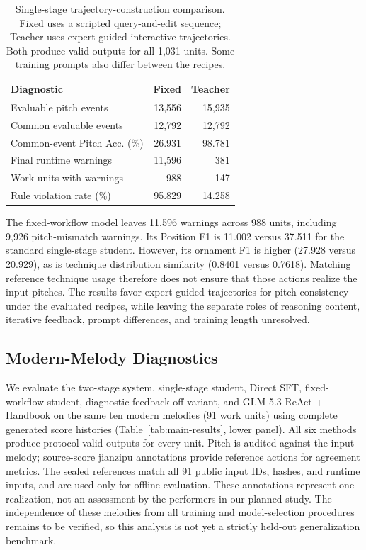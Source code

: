 \begin{table}[t]
\centering\small
\setlength{\tabcolsep}{4pt}
\begin{tabularx}{\linewidth}{@{}Xrr@{}}
\toprule
Diagnostic & Fixed & Teacher \\
\midrule
Evaluable pitch events & 13,556 & 15,935 \\
Common evaluable events & 12,792 & 12,792 \\
Common-event Pitch Acc. (\%) & 26.931 & 98.781 \\
Final runtime warnings & 11,596 & 381 \\
Work units with warnings & 988 & 147 \\
Rule violation rate (\%) & 95.829 & 14.258 \\
\bottomrule
\end{tabularx}
\caption{Single-stage trajectory-construction comparison. Fixed uses a scripted query-and-edit sequence; Teacher uses expert-guided interactive trajectories. Both produce valid outputs for all 1,031 units. Some training prompts also differ between the recipes.}
\label{tab:trajectory-ablation}
\end{table}

The fixed-workflow model leaves 11,596 warnings across 988 units, including 9,926 pitch-mismatch warnings. Its Position F1 is 11.002 versus 37.511 for the standard single-stage student. However, its ornament F1 is higher (27.928 versus 20.929), as is technique distribution similarity (0.8401 versus 0.7618). Matching reference technique usage therefore does not ensure that those actions realize the input pitches. The results favor expert-guided trajectories for pitch consistency under the evaluated recipes, while leaving the separate roles of reasoning content, iterative feedback, prompt differences, and training length unresolved.

\subsection{Modern-Melody Diagnostics}
We evaluate the two-stage system, single-stage student, Direct SFT, fixed-workflow student, diagnostic-feedback-off variant, and GLM-5.3 ReAct + Handbook on the same ten modern melodies (91 work units) using complete generated score histories (Table~\ref{tab:main-results}, lower panel). All six methods produce protocol-valid outputs for every unit. Pitch is audited against the input melody; source-score jianzipu annotations provide reference actions for agreement metrics. The sealed references match all 91 public input IDs, hashes, and runtime inputs, and are used only for offline evaluation. These annotations represent one realization, not an assessment by the performers in our planned study. The independence of these melodies from all training and model-selection procedures remains to be verified, so this analysis is not yet a strictly held-out generalization benchmark.

